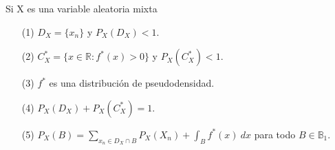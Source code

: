 \begin{obs}
    Si X es una variable aleatoria mixta
    \begin{enumerate}
        \item[(1)] $D_X = \{x_n\}$ y $P_X(D_X) < 1$.
        \item[(2)] $C_X^* = \{ x \in \mathbb{R} : f^*(x) > 0 \}$ y $P_X(C_X^*) < 1$.
        \item[(3)] $f^*$ es una distribución de pseudodensidad.
        \item[(4)] $P_X(D_X) + P_X(C_X^*) = 1$.
        \item[(5)] $P_X(B) = \sum_{x_n \in D_X \cap B}{P_X(X_n)} + \int_{B}{f^*(x) \ dx}$ para todo $B \in \mathbb{B}_1$.
    \end{enumerate}
\end{obs}